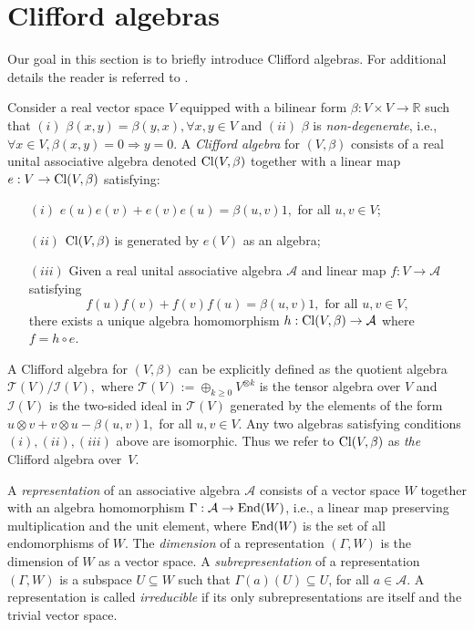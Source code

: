 \documentclass{siamart}
\begin{document}



\appendix

\section{Clifford algebras}\label{sec:Clifford}
Our goal in  this section is to briefly introduce  Clifford algebras. For additional details the reader is referred to  \cite[Chapter 6]{GW}.

Consider a  real vector space $V$ equipped with a    bilinear form $\beta: V\times V\rightarrow {\mathbb{R}}$ such that $(i)$ $\beta(x,y)=\beta(y,x), \forall x,y\in V$ and $(ii)$  $\beta$ is {\em non-degenerate}, i.e., $\forall x\in V, \beta(x,y)=0\Longrightarrow y=0
$.  A {\em Clifford algebra} for $(V,\beta )$ consists of  a real  unital associative  algebra denoted  ${\rm Cl}(V,\beta)$  together with a linear map $e: V \rightarrow {\rm Cl}(V,\beta)$   satisfying:
\vspace{0.1cm}

\begin{itemize}
\item[$(i)$] ${e(u)e(v)+e(v)e(u)}=\beta( u,v)1, $ for all  $u,v\in V$;
\vspace{0.1cm}
\item[$(ii)$] ${\rm Cl}(V,\beta)$ is generated by {$e(V)$} as an algebra;
\vspace{0.1cm}
\item[$(iii)$] Given a    real unital associative  algebra $\mathcal{A}$ and  linear map $f: V \rightarrow \mathcal{A}$ satisfying $$f(u)f(v)+f(v)f(u)=\beta(u,v)
 1, \text{ for all } u,v\in V,$$ there exists a unique algebra homomorphism $h: {\rm Cl}(V,\beta) \rightarrow \mathcal{A} $ where~$f=h\circ e$.
\end{itemize}
\vspace{0.1cm}

A Clifford algebra  for $(V,\beta)$  can be explicitly defined as the quotient algebra $\mathcal{T}(V)/\mathcal{I}(V),$ where $\mathcal{T}(V):=\oplus_{k\ge 0 }V^{\otimes k}$ is the tensor algebra over $V$ and $\mathcal{I}(V)$ is the two-sided ideal in $\mathcal{T}(V)$  generated by the elements of the form  $u\otimes v+v\otimes u-\beta(u,v)1,$ for all $u,v\in V$. 
Any two algebras satisfying conditions $(i), (ii), (iii)$ above are isomorphic. Thus we refer to ${\rm Cl}(V,\beta)$  as {\em the} Clifford algebra over~$V$.

A {\em representation} of an associative algebra $\mathcal{A}$
consists of a vector space $W$ together with an algebra homomorphism
$\Gamma: \mathcal{A} \rightarrow {\rm End}(W)$, i.e., a linear map
preserving multiplication and the unit element, {where ${\rm
End}(W)$ is the set of all endomorphisms of $W$}. The {\em
dimension} of a representation $(\Gamma,W)$ is the dimension of $W$
as a vector space.   A {\em subrepresentation} of a representation
$(\Gamma,W)$ is a subspace $U\subseteq W$ such that
$\Gamma(a)(U)\subseteq U$, for all $a\in \mathcal{A}$.    A
representation is called {\em irreducible} if its only
subrepresentations are itself and the trivial vector space.
 
\end{document}
